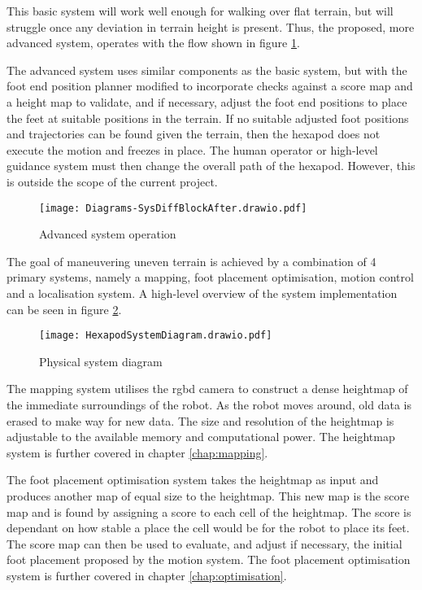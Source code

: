 \noindent
This basic system will work well enough for walking over flat terrain, but will struggle once any
deviation in terrain height is present. Thus, the proposed, more advanced system, operates with the flow shown in figure \ref{fig:adv_sys}.

The advanced system uses similar components as the basic system, but with the foot end position planner modified to incorporate
checks against a score map and a height map to validate, and if necessary, adjust the foot 
end positions to place the feet at suitable positions in the  terrain. If no suitable adjusted foot positions and trajectories
can be found given the terrain, then the hexapod does not execute the motion and freezes in place. The human operator or
high-level guidance system must then change the overall path of the hexapod. However, this is outside the scope of the current
project.

\newpage
\begin{figure}[h]
    \centering
    \texttt{[image: Diagrams-SysDiffBlockAfter.drawio.pdf]}
    \caption{Advanced system operation}
    \label{fig:adv_sys}
\end{figure}

\noindent
The goal of maneuvering uneven terrain is achieved by a combination of 4 primary systems, namely a mapping, 
foot placement optimisation, motion control and a localisation system. A high-level overview of the system implementation can be seen
in figure \ref{fig:system_diagram}.
\begin{figure}[h]
    \centering
    \texttt{[image: HexapodSystemDiagram.drawio.pdf]}
    \caption{Physical system diagram}
    \label{fig:system_diagram}
\end{figure}

\noindent
The mapping system utilises the \ac*{rgbd} camera to construct a dense heightmap of the immediate surroundings of the robot. As the robot moves around, old data is erased to make way for new data. The size and resolution of the heightmap is adjustable to the available memory and computational power. The heightmap system is further covered in chapter \ref{chap:mapping}.

The foot placement optimisation system takes the heightmap as input and produces another map of equal size to the heightmap. This new map is the score map and is found by assigning a score to each cell of the heightmap. The score is dependant on how stable a place the cell would be for the robot to place its feet. The score map can then be used to evaluate, and adjust if necessary, the initial foot placement proposed by the motion system. The foot placement optimisation system is further covered in chapter \ref{chap:optimisation}.

